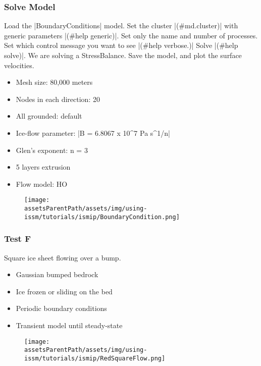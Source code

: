 \subsubsection{Solve Model} %
Load the \lstinlinebg|BoundaryConditions| model. Set the cluster \lstinlinebg|(#md.cluster)| with generic parameters \lstinlinebg|(#help generic)|. Set only the name and number of processes. Set which control message you want to see \lstinlinebg|(#help verbose.)| Solve \lstinlinebg|(#help solve)|. We are solving a StressBalance. Save the model, and plot the surface velocities.
\begin{itemize}
	\item Mesh size: 80,000 meters
	\item Nodes in each direction: 20
	\item All grounded: default
	\item Ice-flow parameter: \lstinlinebg|B = 6.8067 x 10^7 Pa s^1/n|
	\item Glen's exponent: n = 3
	\item 5 layers extrusion
	\item Flow model: HO
\end{itemize}
\begin{figure}[H]
	\begin{center}
		\texttt{[image: \\assetsParentPath/assets/img/using-issm/tutorials/ismip/BoundaryCondition.png]}
	\end{center}
\end{figure}
\subsubsection{Test F} %
Square ice sheet flowing over a bump.
\begin{itemize}
	\item Gaussian bumped bedrock
	\item Ice frozen or sliding on the bed
	\item Periodic boundary conditions
	\item Transient model until steady-state
\end{itemize}
\begin{figure}[H]
	\begin{center}
		\texttt{[image: \\assetsParentPath/assets/img/using-issm/tutorials/ismip/RedSquareFlow.png]}
	\end{center}
\end{figure}
